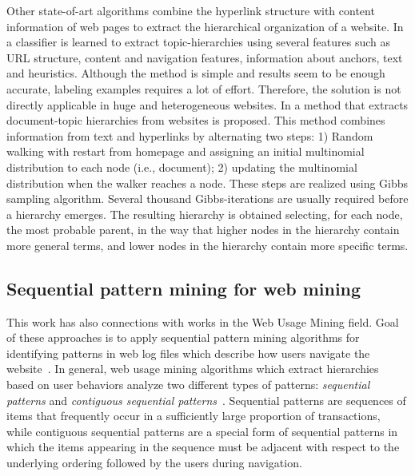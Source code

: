 Other state-of-art algorithms combine the hyperlink structure with content information of web pages to extract the hierarchical organization of a website. 
In \cite{Yang:2009} a classifier is learned to extract topic-hierarchies using several features such as URL structure, content and navigation features, information about anchors, text and heuristics. Although the method is simple and results seem to be enough accurate, labeling examples requires a lot of effort. Therefore, the solution is not directly applicable in huge and heterogeneous websites. 
In \cite{Weninger:2012} a method that extracts document-topic hierarchies from websites is proposed. This method  combines information from text and hyperlinks %
by alternating two steps: 1) Random walking with restart from homepage and assigning an initial multinomial distribution to each node (i.e., document); 2) updating the multinomial distribution when the walker reaches a node. These steps are realized using Gibbs sampling algorithm. Several thousand Gibbs-iterations are usually required before
a hierarchy emerges.
The resulting hierarchy is obtained selecting, for each node, the most probable parent, in the way that higher nodes  in the hierarchy contain more general terms, and lower nodes  in the hierarchy contain more specific terms.




\subsection{Sequential pattern mining for web mining}
This work has also connections with works in the Web Usage Mining field. Goal of these approaches is to apply sequential pattern mining algorithms for identifying patterns in web log files which describe how users  navigate the website~\cite{Baumgarten:1999, Mobasher:2007}. In general, web usage mining algorithms which extract hierarchies based on user behaviors analyze two different types of patterns: \textit{sequential patterns} and \textit{contiguous sequential patterns}~\cite{Mobasher:2007}. 
Sequential patterns are sequences of items that frequently occur in a sufficiently large proportion of transactions, while contiguous sequential patterns are a special form of sequential patterns in which the items appearing in the sequence must be adjacent with respect to the underlying ordering followed by the users during navigation.


